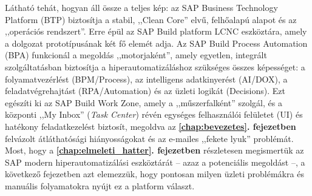 Látható tehát, hogyan áll össze a teljes kép: az SAP Business Technology Platform (BTP) biztosítja a stabil, ,,Clean Core'' elvű, felhőalapú alapot és az ,,operációs rendszert''.
Erre épül az SAP Build platform LCNC eszköztára, amely a dolgozat prototípusának két fő elemét adja.
Az SAP Build Process Automation (BPA) funkcionál a megoldás ,,motorjaként'', amely egyetlen, integrált szolgáltatásban biztosítja a hiperautomatizáláshoz szükséges összes képességet: a folyamatvezérlést (BPM/Process), az intelligens adatkinyerést (AI/DOX), a feladatvégrehajtást (RPA/Automation) és az üzleti logikát (Decisions).
Ezt egészíti ki az SAP Build Work Zone, amely a ,,műszerfalként'' szolgál, és a központi ,,My Inbox'' (\textit{Task Center}) révén egységes felhasználói felületet (UI) és hatékony feladatkezelést biztosít, megoldva az \textbf{\ref{chap:bevezetes}. fejezetben} felvázolt átláthatósági hiányosságokat és az e-mailes ,,fekete lyuk'' problémát.
Most, hogy a \textbf{\ref{chap:elmeleti_hatter}. fejezetben} részletesen megismertük az SAP modern hiperautomatizálási eszköztárát – azaz a potenciális megoldást –, a következő fejezetben azt elemezzük, hogy pontosan milyen üzleti problémákra és manuális folyamatokra nyújt ez a platform választ.